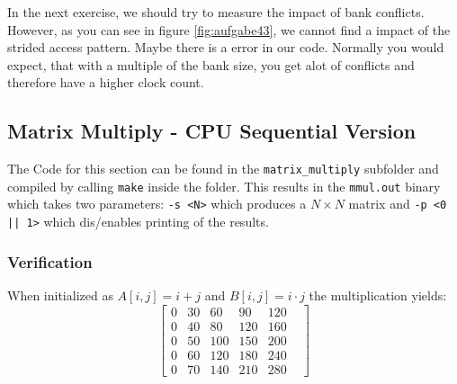 \documentclass[12pt]{article}
\begin{document}
In the next exercise, we should try to measure the impact of bank conflicts. However, as you can see in figure \ref{fig:aufgabe43}, we cannot find a impact of the strided access pattern. Maybe there is a error in our code. Normally you would expect, that with a multiple of the bank size, you get alot of conflicts and therefore have a higher clock count.


\subsection{Matrix Multiply - CPU Sequential Version}
The Code for this section can be found in the \texttt{matrix\_multiply} subfolder
and compiled by calling \texttt{make} inside the folder.
This results in the \texttt{mmul.out} binary which takes two parameters: \verb|-s <N>| which
produces a $ N \times N $ matrix and \verb#-p <0 || 1># which dis/enables printing of the results.
\subsubsection{Verification}
When initialized as $ A[i, j] = i + j $ and $ B[i, j] = i \cdot j $ the multiplication yields:
\begin{equation}
\begin{bmatrix}
0 & 30 & 60  & 90  & 120 & \\
0 & 40 & 80  & 120 & 160 & \\
0 & 50 & 100 & 150 & 200 & \\
0 & 60 & 120 & 180 & 240 & \\
0 & 70 & 140 & 210 & 280 &
\end{bmatrix}
\end{equation}
\end{document}
